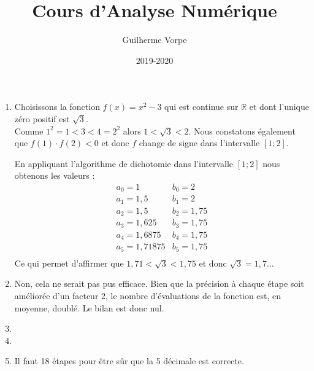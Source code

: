 \documentclass[11pt,a4paper,twoside]{report}
\title{Cours d'Analyse Numérique}
\author{Guilherme Vorpe}
\date{2019-2020}
\begin{document}
\begin{enumerate}[label=R4.\arabic*, font=\bfseries, itemsep=8mm,labelsep*=4mm]
\item
Choisissons la fonction $f(x)=x^2-3$ qui est continue sur $\mathbb{R}$ et dont l'unique zéro positif est $\sqrt{3}$.\\
Comme $1^2=1<3<4=2^2$ alors $1<\sqrt{3}<2$. Nous constatons également que $f(1)\cdot f(2)<0$ et donc $f$ change de signe dans l'intervalle $[1;2]$.

En appliquant l'algorithme de dichotomie dans l'intervalle $[1;2]$ nous obtenons les valeurs :
$$
\begin{array}{ll}
  a_0 = 1			& b_0 = 2 \\
  a_1 = 1,5			& b_1 = 2 \\
  a_2 = 1,5		& b_2 = 1,75 \\
  a_3 = 1,625		& b_3 = 1,75 \\
  a_4 = 1,6875		& b_4 = 1,75 \\
  a_5 = 1,71875		& b_5 = 1,75 \\
\end{array}
$$
Ce qui permet d'affirmer que $1,71<\sqrt{3}<1,75$ et donc $\sqrt{3}= 1,7...$






\item
Non, cela ne serait pas pus efficace. Bien que la précision à chaque étape soit améliorée d'un facteur 2, le nombre d'évaluations de la fonction est, en moyenne, doublé. Le bilan est donc nul.







\item
{}




\item
{}







\item
Il faut 18 étapes pour être sûr que la 5 décimale est correcte.







\end{enumerate}
\end{document}
